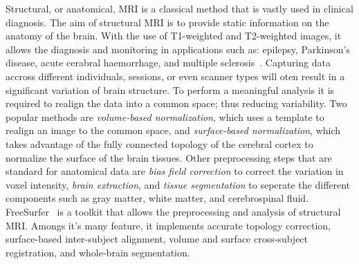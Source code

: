 Structural, or anatomical, MRI is a classical method that is vastly used in clinical diagnosis.
The aim of structural MRI is to provide static information on the anatomy of the brain.
With the use of T1-weighted and T2-weighted images, it allows the diagnosis and 
monitoring in applications such as: epilepsy, Parkinson's disease, acute 
cerabral haemorrhage, and multiple sclerosis~\cite{Symms2004-xj}.
Capturing data accross different individuals, sessions, or even scanner types will
oten result in a significant variation of brain structure.
To perform a meaningful analysis it is required to realign the data into
a common space; thus reducing variability.
Two popular methods are \textit{volume-based normalization}, which uses a
template to realign an image to the common space, and \textit{surface-based normalization},
which takes advantage of the fully connected topology of the cerebral cortex to
normalize the surface of the brain tissues.
Other preprocessing steps that are standard for anatomical data are \textit{bias field correction}
to correct the variation in voxel intensity, \textit{brain extraction}, and \textit{tissue segmentation}
to seperate the different components such as gray matter, white matter, and cerebrospinal fluid.
FreeSurfer~\cite{Fischl2012-bp} is a toolkit that allows the preprocessing and analysis of structural MRI.
Amongs it's many feature, it implements accurate topology correction, surface-based inter-subject alignment,
volume and surface cross-subject registration, and whole-brain segmentation.

